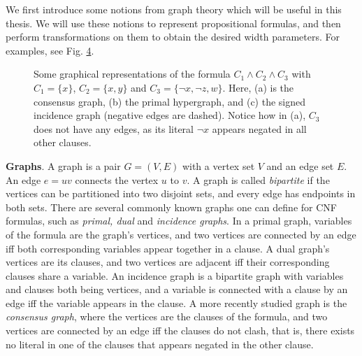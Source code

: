 We first introduce some notions from graph theory which will be useful in this thesis.
We will use these notions to represent propositional formulas, and then perform transformations on them to obtain the desired width parameters.
For examples, see Fig. \ref{fig:graphs}.\\

\begin{figure}
	\centering
	\begin{subfigure}[b]{0.22\textwidth}
		
		\caption{}
		\label{fig:consensus}
	\end{subfigure}
	\begin{subfigure}[b]{0.38\textwidth}
		
		\caption{}
		\label{fig:hypergraph}
	\end{subfigure}
	\begin{subfigure}[b]{0.3\textwidth}
		
		\caption{}
		\label{fig:trigraph}
	\end{subfigure}
	\caption{
		Some graphical representations of the formula $C_1 \land C_2 \land C_3$ with $C_1 = \{x\}$, $C_2 = \{x,y\}$ and $C_3=\{\neg x, \neg z, w\}$.
		Here, (a) is the consensus graph, (b) the primal hypergraph, and (c) the signed incidence graph (negative edges are dashed).
		Notice how in (a), $C_3$ does not have any edges, as its literal $\neg x$ appears negated in all other clauses.
	}
	\label{fig:graphs}
\end{figure}

\noindent
\textbf{Graphs}.
A graph is a pair $G = (V,E)$ with a vertex set $V$ and an edge set $E$.
An edge $e=uv$ connects the vertex $u$ to $v$.
A graph is called {\em bipartite} if the vertices can be partitioned into two disjoint sets, and every edge has endpoints in both sets.
There are several commonly known graphs one can define for CNF formulas, such as {\em primal, dual} and {\em incidence graphs}.
In a primal graph, variables of the formula are the graph's vertices, and two vertices are connected by an edge iff both corresponding variables appear together in a clause.
A dual graph's vertices are its clauses, and two vertices are adjacent iff their corresponding clauses share a variable.
An incidence graph is a bipartite graph with variables and clauses both being vertices, and a variable is connected with a clause by an edge iff the variable appears in the clause.
A more recently studied graph is the {\em consensus graph}, where the vertices are the clauses of the formula, and two vertices are connected by an edge iff the clauses do not clash, that is, there exists no literal in one of the clauses that appears negated in the other clause.\\

